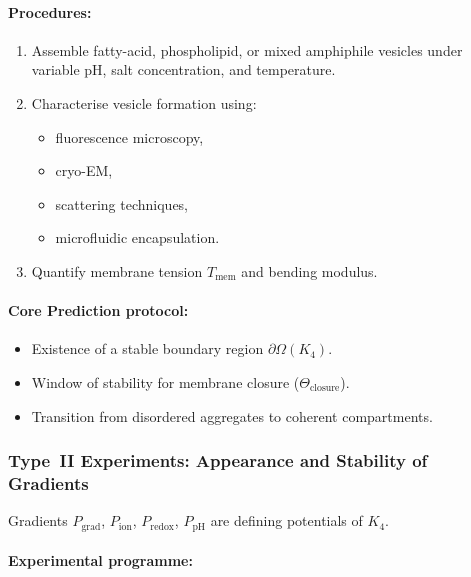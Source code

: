 \paragraph{Procedures:}

\begin{enumerate}
    \item Assemble fatty-acid, phospholipid, or mixed amphiphile vesicles
          under variable pH, salt concentration, and temperature.
    \item Characterise vesicle formation using:
          \begin{itemize}
              \item fluorescence microscopy,
              \item cryo-EM,
              \item scattering techniques,
              \item microfluidic encapsulation.
          \end{itemize}
    \item Quantify membrane tension $T_{\mathrm{mem}}$ and bending modulus.
\end{enumerate}

\paragraph{Core Prediction protocol:}

\begin{itemize}
    \item Existence of a stable boundary region $\partial\Omega(K_4)$.
    \item Window of stability for membrane closure
          ($\Theta_{\mathrm{closure}}$).
    \item Transition from disordered aggregates to coherent compartments.
\end{itemize}



\subsubsection{Type~II Experiments: Appearance and Stability of Gradients}

Gradients $P_{\mathrm{grad}}$, $P_{\mathrm{ion}}$,
$P_{\mathrm{redox}}$, $P_{\mathrm{pH}}$ are defining potentials of $K_4$.

\paragraph{Experimental programme:}

